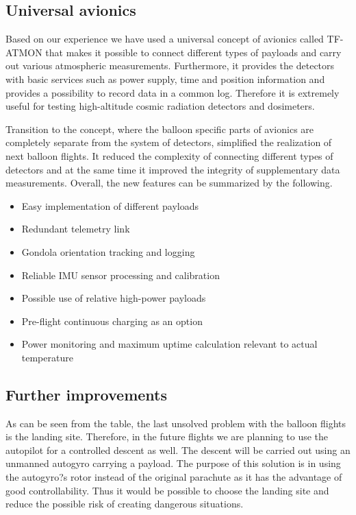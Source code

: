 \documentclass{Rpd}
\begin{document}
\subsection{Universal avionics}

Based on our experience we have used a universal concept of avionics called TF-ATMON that makes it possible to connect different types of payloads and carry out various atmospheric measurements. Furthermore, it provides the detectors with basic services such as power supply, time and position information and provides a possibility to record data in a common log. Therefore it is extremely useful for testing high-altitude cosmic radiation detectors and dosimeters.


Transition to the concept, where the balloon specific parts of avionics are completely separate from the system of detectors, simplified the realization of next balloon flights. It reduced the complexity of connecting different types of detectors and at the same time it improved the integrity of supplementary data measurements. Overall, the new features can be summarized by the following.

\begin{itemize}
\item Easy implementation of different payloads
\item Redundant telemetry link
\item Gondola orientation tracking and logging
\item Reliable IMU sensor processing and calibration
\item Possible use of relative high-power payloads
\item Pre-flight continuous charging as an option
\item Power monitoring and maximum uptime calculation relevant to actual temperature
\end{itemize}


\subsection{Further improvements}


As can be seen from the table, the last unsolved problem with the balloon flights is the landing site. Therefore, in the future flights we are planning to use the autopilot for a controlled descent as well.
The descent will be carried out using an unmanned autogyro carrying a payload. The purpose of this solution is in using the autogyro?s rotor instead of the original parachute as it has the advantage of good controllability. Thus it would be possible to choose the landing site and reduce the possible risk of creating dangerous situations.
\end{document}
